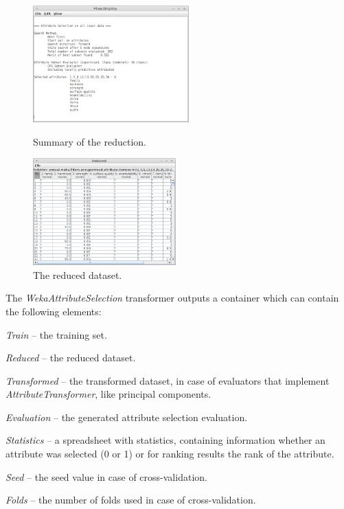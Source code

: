 \begin{figure}[ht]
  \begin{minipage}[t]{0.5\linewidth}
    \centering
    \includegraphics[width=6.0cm]{images/attribute-selection_output1.png}
    \caption{Summary of the reduction.}
    \label{attribute-selection_output1}
  \end{minipage}
  \hspace{0.5cm}
  \begin{minipage}[t]{0.5\linewidth}
    \centering
    \includegraphics[width=5.5cm]{images/attribute-selection_output2.png}
    \caption{The reduced dataset.}
    \label{attribute-selection_output2}
  \end{minipage}
\end{figure}

The \textit{WekaAttributeSelection} transformer outputs a container which can 
contain the following elements:
\begin{tight_itemize}
	\item \textit{Train} -- the training set.
	\item \textit{Reduced} -- the reduced dataset.
	\item \textit{Transformed} -- the transformed dataset, in case of evaluators that 
	implement \textit{AttributeTransformer}, like principal components.
	\item \textit{Evaluation} -- the generated attribute selection evaluation.
	\item \textit{Statistics} -- a spreadsheet with statistics, containing
	information whether an attribute was selected (0 or 1) or for ranking results
	the rank of the attribute.
	\item \textit{Seed} -- the seed value in case of cross-validation.
	\item \textit{Folds} -- the number of folds used in case of cross-validation.
\end{tight_itemize}
